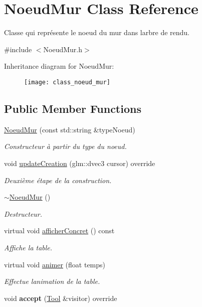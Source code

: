 \hypertarget{class_noeud_mur}{}\section{Noeud\+Mur Class Reference}
\label{class_noeud_mur}


Classe qui représente le noeud du mur dans l\textquotesingle{}arbre de rendu.  




{\ttfamily \#include $<$Noeud\+Mur.\+h$>$}

Inheritance diagram for Noeud\+Mur\+:\begin{figure}[H]
\begin{center}
\leavevmode
\texttt{[image: class\_noeud\_mur]}
\end{center}
\end{figure}
\subsection*{Public Member Functions}
{\bf }\par
\begin{DoxyCompactItemize}
\item 
\hyperlink{class_noeud_mur_aeab2deec90548c0bdca5eb86beb629cf}{Noeud\+Mur} (const std\+::string \&type\+Noeud)
\begin{DoxyCompactList}\small\item\em Constructeur à partir du type du noeud. \end{DoxyCompactList}\item 
void \hyperlink{class_noeud_mur_a9f86d3ce3675f79abe879143e6dd4e8b}{update\+Creation} (glm\+::dvec3 cursor) override
\begin{DoxyCompactList}\small\item\em Deuxième étape de la construction. \end{DoxyCompactList}\item 
\hyperlink{class_noeud_mur_a169060e04a6423e7f025d475afd7d9ea}{$\sim$\+Noeud\+Mur} ()
\begin{DoxyCompactList}\small\item\em Destructeur. \end{DoxyCompactList}\item 
virtual void \hyperlink{class_noeud_mur_a521a3062875ea6ed1645485412a70c7b}{afficher\+Concret} () const 
\begin{DoxyCompactList}\small\item\em Affiche la table. \end{DoxyCompactList}\item 
virtual void \hyperlink{class_noeud_mur_a416be055b332d2434106868d6fad7059}{animer} (float temps)
\begin{DoxyCompactList}\small\item\em Effectue l\textquotesingle{}animation de la table. \end{DoxyCompactList}\item 
\hypertarget{class_noeud_mur_a267fe3fba8110e59fa76412f788ea8d1}{}void {\bfseries accept} (\hyperlink{class_tool}{Tool} \&visitor) override\label{class_noeud_mur_a267fe3fba8110e59fa76412f788ea8d1}

\end{DoxyCompactItemize}

